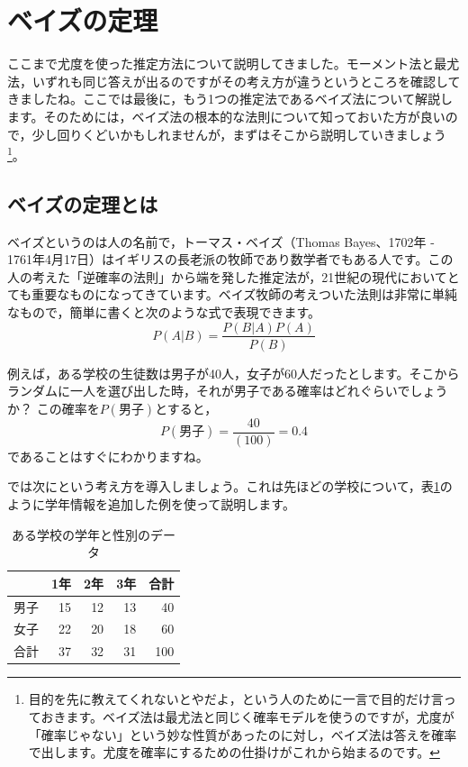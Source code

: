
\section{ベイズの定理}
ここまで尤度を使った推定方法について説明してきました。モーメント法と最尤法，いずれも同じ答えが出るのですがその考え方が違うというところを確認してきましたね。ここでは最後に，もう1つの推定法であるベイズ法について解説します。そのためには，ベイズ法の根本的な法則について知っておいた方が良いので，少し回りくどいかもしれませんが，まずはそこから説明していきましょう\footnote{目的を先に教えてくれないとやだよ，という人のために一言で目的だけ言っておきます。ベイズ法は最尤法と同じく確率モデルを使うのですが，尤度が「確率じゃない」という妙な性質があったのに対し，ベイズ法は答えを確率で出します。尤度を確率にするための仕掛けがこれから始まるのです。}。
\subsection{ベイズの定理とは}
ベイズというのは人の名前で，トーマス・ベイズ（Thomas Bayes、1702年 - 1761年4月17日）はイギリスの長老派の牧師であり数学者でもある人です。この人の考えた「逆確率の法則」から端を発した推定法が，21世紀の現代においてとても重要なものになってきています。ベイズ牧師の考えついた法則は非常に単純なもので，簡単に書くと次のような式で表現できます。
\[ P(A|B) = \frac{P(B|A)P(A)}{P(B)} \]


例えば，ある学校の生徒数は男子が40人，女子が60人だったとします。そこからランダムに一人を選び出した時，それが男子である確率はどれぐらいでしょうか？ この確率を$P(\mbox{男子})$とすると，
\[P(\mbox{男子})=\frac{40}{(100)}=0.4 \]
であることはすぐにわかりますね。

では次にという考え方を導入しましょう。これは先ほどの学校について，表\ref{tbl::24_02}のように学年情報を追加した例を使って説明します。


\begin{table}[ht]
    \centering
    \caption{ある学校の学年と性別のデータ} 
    \begin{tabular}{rrrrr}
      \hline
      & 1年 & 2年 & 3年 & 合計 \\
    \hline
    男子 & 15 & 12 & 13 & 40\\
    女子 & 22 & 20 & 18 & 60\\\hline
    合計 & 37 & 32 & 31 & 100\\\hline
    \end{tabular}
      \label{tbl::24_02}
\end{table}

